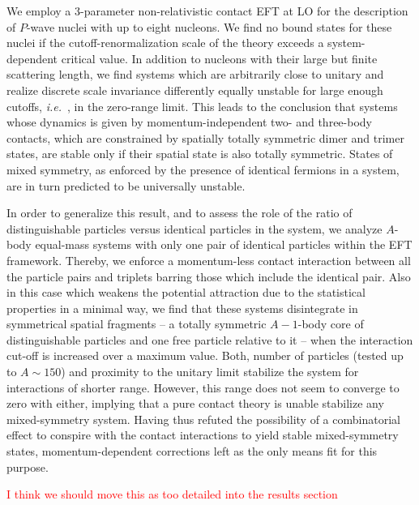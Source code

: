 \documentclass[preprint,12pt]{elsarticle}
\newcommand{\lc}{\ensuremath{\Lambda_c}}
\newcommand{\red}[1]{\textcolor{red}{#1}}
\newcommand{\ie}{\textit{i.e.}~}
\begin{document}
We employ a 3-parameter non-relativistic contact EFT at LO for the description of $P$-wave nuclei with up to eight nucleons.
We find no bound states for these nuclei if the cutoff-renormalization scale of the theory exceeds a system-dependent critical value.
In addition to nucleons with their large but finite scattering length, we find systems which are arbitrarily close to unitary and realize
discrete scale invariance differently equally unstable for large enough cutoffs, \ie, in the zero-range limit.
This leads to the conclusion that systems whose dynamics is given by momentum-independent two- and three-body contacts, which are
constrained by spatially totally symmetric dimer and trimer states, are stable only if their spatial state is also totally symmetric.
States of mixed symmetry, as enforced by the presence of identical fermions in a system, are in turn predicted to be universally unstable. 

In order to generalize this result, and to assess the role of the ratio of distinguishable particles versus identical
particles in the system, we analyze $A$-body equal-mass systems with only one pair of identical particles within the EFT framework.
Thereby, we enforce a momentum-less contact interaction between all the particle pairs and triplets barring those which include the
identical pair. 
Also in this case which weakens the potential attraction due to the statistical properties in a minimal way, we find that these systems 
disintegrate in symmetrical spatial fragments -- a totally symmetric $A-1$-body core of distinguishable particles and one free particle
relative to it -- when the interaction cut-off is increased over a maximum value.
Both, number of particles (tested up to $A\sim150$) and proximity to the unitary limit stabilize the system for interactions of shorter range.
However, this range does not seem to converge to zero with either, implying that a pure contact theory is unable stabilize any mixed-symmetry
system. Having thus refuted the possibility of a combinatorial effect to conspire with the contact interactions to yield stable
mixed-symmetry states, momentum-dependent corrections left as the only means fit for this purpose.

\red{I think we should move this as too detailed into the results section}
\end{document}
